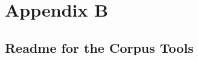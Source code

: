 \appendix

\chapter{Appendix B}
\label{appendix:Readme}
\section{Readme for the Corpus Tools}

      
      
      
      
